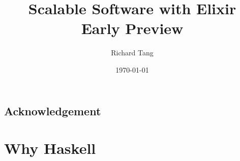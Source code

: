 \documentclass{kdp}
\title{Scalable Software with Elixir \\ Early Preview}
\author{Richard Tang}
\date{\today}
\begin{document}
\maketitle


\section*{Acknowledgement}

\tableofcontents



















\chapter{Why Haskell}
\end{document}
